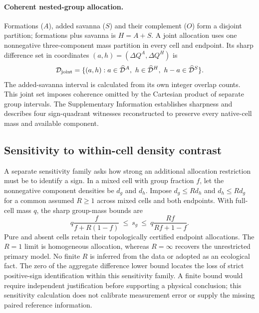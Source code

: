 \paragraph{Coherent nested-group allocation.}
Formations ($A$), added savanna ($S$) and their complement ($O$) form a disjoint partition; formations plus savanna is $H=A+S$. A joint allocation uses one nonnegative three-component mass partition in every cell and endpoint. Its sharp difference set in coordinates $(a,h)=(\Delta Q^A,\Delta Q^H)$ is
\begin{equation}
\mathcal D_{\rm joint}=\{(a,h):a\in\widehat{\mathcal D}^A,\ h\in\widehat{\mathcal D}^H,\ h-a\in\widehat{\mathcal D}^S\}.\label{eq:joint}
\end{equation}
The added-savanna interval is calculated from its own integer overlap counts. This joint set imposes coherence omitted by the Cartesian product of separate group intervals. The Supplementary Information establishes sharpness and describes four sign-quadrant witnesses reconstructed to preserve every native-cell mass and available component.

\subsection{Sensitivity to within-cell density contrast}
A separate sensitivity family asks how strong an additional allocation restriction must be to identify a sign. In a mixed cell with group fraction $f$, let the nonnegative component densities be $d_g$ and $d_h$. Impose $d_g\le R d_h$ and $d_h\le R d_g$ for a common assumed $R\ge1$ across mixed cells and both endpoints. With full-cell mass $q$, the sharp group-mass bounds are
\begin{equation}
q\frac{f}{f+R(1-f)}\ \le\ s_g\ \le\
q\frac{Rf}{Rf+1-f}.\label{eq:contrast}
\end{equation}
Pure and absent cells retain their topologically certified endpoint allocations. The $R=1$ limit is homogeneous allocation, whereas $R=\infty$ recovers the unrestricted primary model. No finite $R$ is inferred from the data or adopted as an ecological fact. The zero of the aggregate difference lower bound locates the loss of strict positive-sign identification within this sensitivity family. A finite bound would require independent justification before supporting a physical conclusion; this sensitivity calculation does not calibrate measurement error or supply the missing paired reference information.
